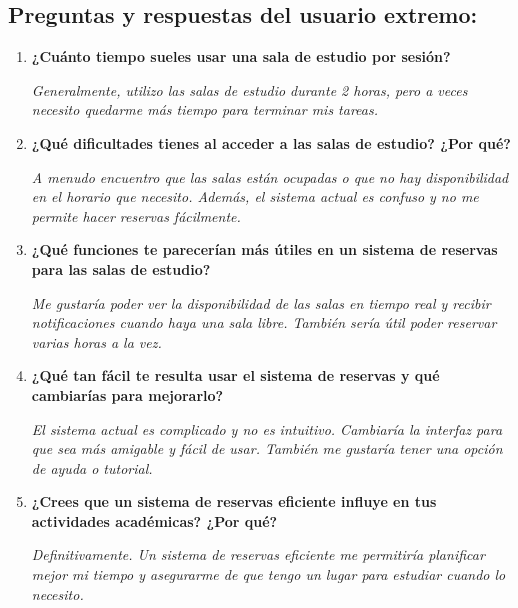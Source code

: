 \documentclass{article}
\begin{document}
\subsection{Preguntas y respuestas del usuario extremo:}

\begin{enumerate}

  \item \textbf{¿Cuánto tiempo sueles usar una sala de estudio por sesión? }
    
    \hspace{1cm}\textit{Generalmente, utilizo las salas de estudio durante 2 horas, pero a veces necesito quedarme más tiempo para terminar mis tareas.}

  \item \textbf{¿Qué dificultades tienes al acceder a las salas de estudio? ¿Por qué?}  
    
    \hspace{1cm}\textit{A menudo encuentro que las salas están ocupadas o que no hay disponibilidad en el horario que necesito. Además, el sistema actual es confuso y no me permite hacer reservas fácilmente.}

  \item \textbf{¿Qué funciones te parecerían más útiles en un sistema de reservas para las salas de estudio?}  
    
    \hspace{1cm}\textit{Me gustaría poder ver la disponibilidad de las salas en tiempo real y recibir notificaciones cuando haya una sala libre. También sería útil poder reservar varias horas a la vez.}

  \item \textbf{¿Qué tan fácil te resulta usar el sistema de reservas y qué cambiarías para mejorarlo?}  
    
    \hspace{1cm}\textit{El sistema actual es complicado y no es intuitivo. Cambiaría la interfaz para que sea más amigable y fácil de usar. También me gustaría tener una opción de ayuda o tutorial.}

  \item \textbf{¿Crees que un sistema de reservas eficiente influye en tus actividades académicas? ¿Por qué?}  
    
    \hspace{1cm}\textit{Definitivamente. Un sistema de reservas eficiente me permitiría planificar mejor mi tiempo y asegurarme de que tengo un lugar para estudiar cuando lo necesito.}

  \end{enumerate}
\end{document}
